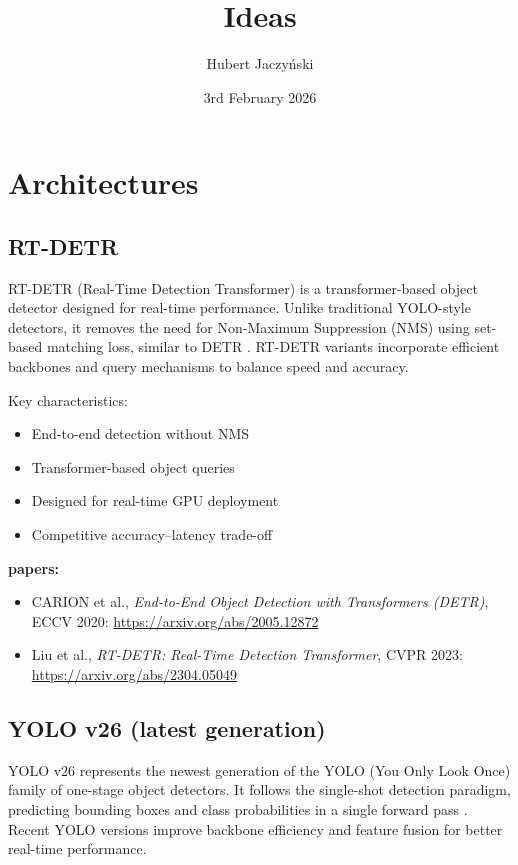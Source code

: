 \documentclass{article}
\title{Ideas}
\author{Hubert Jaczyński}
\date{3rd February 2026}
\begin{document}
\maketitle

\section{Architectures}

\subsection{RT-DETR}

RT-DETR (Real-Time Detection Transformer) is a transformer-based object detector designed for real-time performance. 
Unlike traditional YOLO-style detectors, it removes the need for Non-Maximum Suppression (NMS) using set-based matching loss, similar to DETR \cite{carion2020end}. 
RT-DETR variants incorporate efficient backbones and query mechanisms to balance speed and accuracy.

Key characteristics:
\begin{itemize}
    \item End-to-end detection without NMS \cite{carion2020end}
    \item Transformer-based object queries
    \item Designed for real-time GPU deployment
    \item Competitive accuracy–latency trade-off
\end{itemize}

\textbf{papers:}
\begin{itemize}
    \item CARION et al., \emph{End-to-End Object Detection with Transformers (DETR)}, ECCV 2020: \url{https://arxiv.org/abs/2005.12872}
    \item Liu et al., \emph{RT-DETR: Real-Time Detection Transformer}, CVPR 2023: \url{https://arxiv.org/abs/2304.05049}
\end{itemize}

\subsection{YOLO v26 (latest generation)}

YOLO v26 represents the newest generation of the YOLO (You Only Look Once) family of one-stage object detectors. 
It follows the single-shot detection paradigm, predicting bounding boxes and class probabilities in a single forward pass \cite{redmon2016you}.
Recent YOLO versions improve backbone efficiency and feature fusion for better real-time performance.
\end{document}
